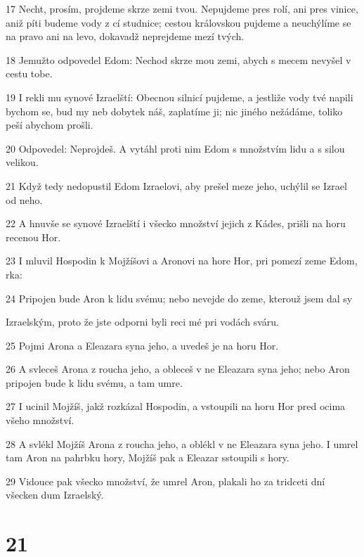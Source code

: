\par 17 Necht, prosím, projdeme skrze zemi tvou. Nepujdeme pres rolí, ani pres vinice, aniž píti budeme vody z cí studnice; cestou královskou pujdeme a neuchýlíme se na pravo ani na levo, dokavadž neprejdeme mezí tvých.
\par 18 Jemužto odpovedel Edom: Nechod skrze mou zemi, abych s mecem nevyšel v cestu tobe.
\par 19 I rekli mu synové Izraelští: Obecnou silnicí pujdeme, a jestliže vody tvé napili bychom se, bud my neb dobytek náš, zaplatíme ji; nic jiného nežádáme, toliko peší abychom prošli.
\par 20 Odpovedel: Neprojdeš. A vytáhl proti nim Edom s množstvím lidu a s silou velikou.
\par 21 Když tedy nedopustil Edom Izraelovi, aby prešel meze jeho, uchýlil se Izrael od neho.
\par 22 A hnuvše se synové Izraelští i všecko množství jejich z Kádes, prišli na horu recenou Hor.
\par 23 I mluvil Hospodin k Mojžíšovi a Aronovi na hore Hor, pri pomezí zeme Edom, rka:
\par 24 Pripojen bude Aron k lidu svému; nebo nevejde do zeme, kterouž jsem dal sy\par Izraelským, proto že jste odporni byli reci mé pri vodách sváru.
\par 25 Pojmi Arona a Eleazara syna jeho, a uvedeš je na horu Hor.
\par 26 A svleceš Arona z roucha jeho, a obleceš v ne Eleazara syna jeho; nebo Aron pripojen bude k lidu svému, a tam umre.
\par 27 I ucinil Mojžíš, jakž rozkázal Hospodin, a vstoupili na horu Hor pred ocima všeho množství.
\par 28 A svlékl Mojžíš Arona z roucha jeho, a oblékl v ne Eleazara syna jeho. I umrel tam Aron na pahrbku hory, Mojžíš pak a Eleazar sstoupili s hory.
\par 29 Vidouce pak všecko množství, že umrel Aron, plakali ho za tridceti dní všecken dum Izraelský.

\chapter{21}

